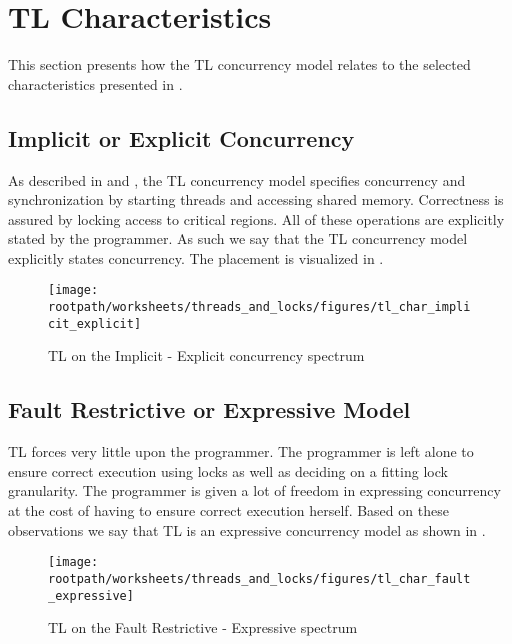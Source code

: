 
\section{\acl{TL} Characteristics}
This section presents how the \ac{TL} concurrency model relates to the selected characteristics presented in . 

\subsection{Implicit or Explicit Concurrency}
As described in  and , the \ac{TL} concurrency model specifies concurrency and synchronization by starting threads and accessing shared memory. Correctness is assured by locking access to critical regions. All of these operations are explicitly stated by the programmer. As such we say that the \ac{TL} concurrency model explicitly states concurrency. The placement is visualized in .

\begin{figure}[htbp]
\centering
 \texttt{[image: \\rootpath/worksheets/threads\_and\_locks/figures/tl\_char\_implicit\_explicit]} 
 \caption{\ac{TL} on the Implicit - Explicit concurrency spectrum}
\label{fig:char_implicit_explicit}
\end{figure}

\subsection{Fault Restrictive or Expressive Model}
\ac{TL} forces very little upon the programmer. The programmer is left alone to ensure correct execution using locks as well as deciding on a fitting lock granularity. The programmer is given a lot of freedom in expressing concurrency at the cost of having to ensure correct execution herself. Based on these observations we say that \ac{TL} is an expressive concurrency model as shown in .

\begin{figure}[htbp]
\centering
 \texttt{[image: \\rootpath/worksheets/threads\_and\_locks/figures/tl\_char\_fault\_expressive]} 
 \caption{\ac{TL} on the Fault Restrictive - Expressive spectrum}
\label{fig:char_fault_expressive}
\end{figure}

